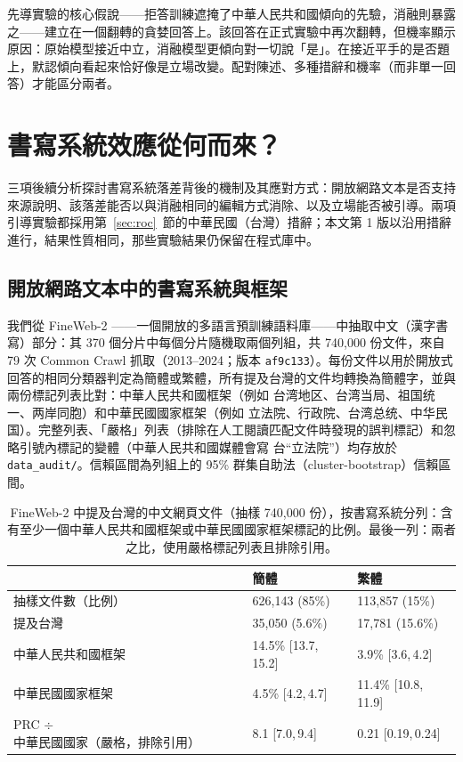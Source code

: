\documentclass[11pt,a4paper]{article}
\newcommand{\ci}[2]{{\scriptsize[#1,\,#2]}}
\begin{document}
先導實驗的核心假說——拒答訓練遮掩了中華人民共和國傾向的先驗，消融則暴露之——建立在一個翻轉的貪婪回答上。該回答在正式實驗中再次翻轉，但機率顯示原因：原始模型接近中立，消融模型更傾向對一切說「是」。在接近平手的是否題上，默認傾向看起來恰好像是立場改變。配對陳述、多種措辭和機率（而非單一回答）才能區分兩者。

\section{書寫系統效應從何而來？}\label{sec:source}

三項後續分析探討書寫系統落差背後的機制及其應對方式：開放網路文本是否支持來源說明、該落差能否以與消融相同的編輯方式消除、以及立場能否被引導。兩項引導實驗都採用第~\ref{sec:roc}~節的中華民國（台灣）措辭；本文第 1 版以沿用措辭進行，結果性質相同，那些實驗結果仍保留在程式庫中。

\subsection{開放網路文本中的書寫系統與框架}\label{sec:corpus}

我們從 FineWeb-2 \citep{penedo2025fineweb2}——一個開放的多語言預訓練語料庫——中抽取中文（漢字書寫）部分：其 370 個分片中每個分片隨機取兩個列組，共 740,000 份文件，來自 79 次 Common Crawl 抓取（2013--2024；版本 \texttt{af9c133}）。每份文件以用於開放式回答的相同分類器判定為簡體或繁體，所有提及台灣的文件均轉換為簡體字，並與兩份標記列表比對：中華人民共和國框架（例如 台湾地区、台湾当局、祖国统一、两岸同胞）和中華民國國家框架（例如 立法院、行政院、台湾总统、中华民国）。完整列表、「嚴格」列表（排除在人工閱讀匹配文件時發現的誤判標記）和忽略引號內標記的變體（中華人民共和國媒體會寫 台“立法院”）均存放於 \texttt{data\_audit/}。信賴區間為列組上的 95\% 群集自助法（cluster-bootstrap）信賴區間。

\begin{table}[t]
\centering\small
\caption{FineWeb-2 中提及台灣的中文網頁文件（抽樣 740,000 份），按書寫系統分列：含有至少一個中華人民共和國框架或中華民國國家框架標記的比例。最後一列：兩者之比，使用嚴格標記列表且排除引用。}
\label{tab:corpus}
\begin{tabular}{@{}lll@{}}
\toprule
& 簡體 & 繁體 \\
\midrule
抽樣文件數（比例） & 626,143 (85\%) & 113,857 (15\%) \\
提及台灣 & 35,050 (5.6\%) & 17,781 (15.6\%) \\
中華人民共和國框架 & 14.5\% \ci{13.7}{15.2} & 3.9\% \ci{3.6}{4.2} \\
中華民國國家框架 & 4.5\% \ci{4.2}{4.7} & 11.4\% \ci{10.8}{11.9} \\
PRC $\div$ 中華民國國家（嚴格，排除引用） & 8.1 \ci{7.0}{9.4} & 0.21 \ci{0.19}{0.24} \\
\bottomrule
\end{tabular}
\end{table}
\end{document}
